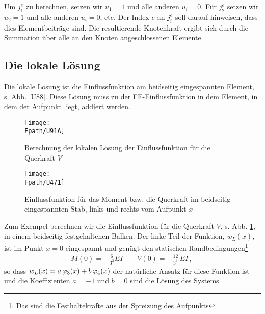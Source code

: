 \begin{example}
Um $j_1^e$ zu berechnen, setzen wir $u_1 = 1$ und alle anderen $u_i = 0$. F\"{u}r $j_2^e$ setzen wir $u_2 = 1$ und alle anderen $u_i = 0$, etc. Der Index $e$ an $j_i^e$ soll darauf hinweisen, dass dies Elementbeitr\"{a}ge sind. Die resultierende Knotenkraft ergibt sich durch die Summation \"{u}ber alle an den Knoten angeschlossenen Elemente.
\end{example}

{\textcolor{sectionTitleBlue}{\section{Die lokale L\"{o}sung}}}\label{lokaleL\"{o}sung}
Die lokale L\"{o}sung ist die Einflussfunktion am beidseitig eingespannten Element, s. Abb. \ref{U88}. Diese L\"{o}sung muss zu der FE-Einflussfunk\-ti\-on in dem Element, in dem der Aufpunkt liegt, addiert werden.
\begin{figure}[tbp]
\centering
\if {} \sidecaption \fi
\texttt{[image: \\Fpath/U91A]}
\caption{Berechnung der lokalen L\"{o}sung der Einflussfunktion f\"{u}r die Querkraft $V$ }
\label{U91}
\end{figure}%
\begin{figure}[tbp]
\centering
\if {} \sidecaption \fi
\texttt{[image: \\Fpath/U471]}
\caption{Einflussfunktion f\"{u}r das Moment bzw. die Querkraft im beidseitig eingespannten Stab, links und rechts vom Aufpunkt $x$ }
\label{U471}
\end{figure}%
Zum Exempel berechnen wir die Einflussfunktion f\"{u}r die Querkraft $V$, s. Abb. \ref{U91}, in einem beidseitig festgehaltenen Balken. Der linke Teil der Funktion, $w_L(x)$, ist im Punkt $x = 0$ eingespannt und gen\"{u}gt den statischen Randbedingungen\footnote{Das sind die Festhaltekr\"{a}fte aus der Spreizung des Aufpunkts}
\begin{align}
M(0) = - \frac{6}{3^2} EI  \qquad V(0) = - \frac{12}{3^3}\,EI\,,\
\end{align}
so dass $ w_L(x) = a\,\varphi_3(x) + b\,\varphi_4(x)$ der nat\"{u}rliche Ansatz f\"{u}r diese Funktion ist und die Koeffizienten $a = -1$ und $b = 0$ sind die L\"{o}sung des Systems
